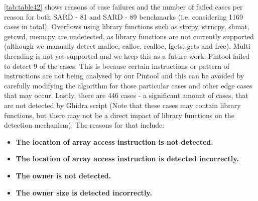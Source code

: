 \cref{tab:table42} shows reasons of case failures and the number of failed cases per reason for both SARD - 81 and SARD - 89 benchmarks (i.e. considering 1169 cases in total). Overflows using library functions such as strcpy, strncpy, shmat, getcwd, memcpy are undetected, as library functions are not currently supported (although we manually detect malloc, calloc, realloc, fgets, gets and free). Multi threading is not yet supported and we keep this as a future work. Pintool failed to detect 9 of the cases. This is because certain instructions or pattern of instructions are not being analysed by our Pintool and this can be avoided by carefully modifying the algorithm for those particular cases and other edge cases that may occur. Lastly, there are 446 cases - a significant amount of cases, that are not detected by Ghidra script (Note that these cases may contain library functions, but there may not be a direct impact of library functions on the detection mechanism). The reasons for that include:
\begin{itemize}
    \item \textbf{The location of array access instruction is not detected.}
    \item \textbf{The location of array access instruction is detected incorrectly.}
    \item \textbf{The owner is not detected.}
    \item \textbf{The owner size is detected incorrectly.}
\end{itemize}
